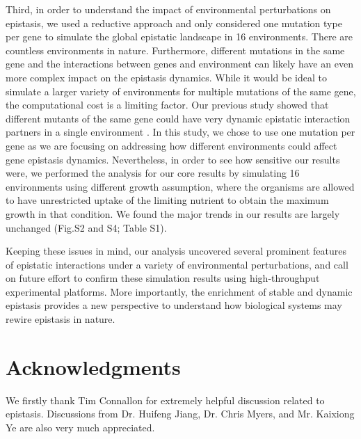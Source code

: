 \documentclass[10pt]{article}
\newcommand{\Figs}{Fig.} %
\newcommand{\citep}{\cite}
\begin{document}
Third, in order to understand the impact of environmental
perturbations on epistasis, we used a reductive approach and only
considered one mutation type per gene to simulate the global epistatic
landscape in 16 environments. There are countless environments in
nature. Furthermore, different mutations in the same gene and the
interactions between genes and environment can likely have an even
more complex impact on the epistasis dynamics. While it would be ideal
to simulate a larger variety of environments for multiple
mutations of the same gene, the computational cost is a limiting
factor. Our previous study showed that different mutants of the same
gene could have very dynamic epistatic interaction partners in a
single environment \citep{Xu2012}. In this study, we chose to use one
mutation per gene as we are focusing on addressing how different
environments could affect gene epistasis dynamics. Nevertheless, in
order to see how sensitive our results were, we performed the analysis
for our core results by simulating 16 environments using different
growth assumption, where the organisms are allowed to have
unrestricted uptake of the limiting nutrient to obtain the maximum
growth in that condition. We found the major trends in our results are
largely unchanged (\Figs S2 and S4; Table S1).

Keeping these issues in mind, our analysis uncovered several prominent
features of epistatic interactions under a variety of environmental
perturbations, and call on future effort to confirm these simulation
results using high-throughput experimental platforms. More
importantly, the enrichment of stable and dynamic epistasis provides a
new perspective to understand how biological systems may rewire
epistasis in nature.


\section*{Acknowledgments}

We firstly thank Tim Connallon for extremely helpful discussion
related to epistasis. Discussions from Dr. Huifeng Jiang, Dr. Chris
Myers, and Mr. Kaixiong Ye are also very much appreciated.

\end{document}
